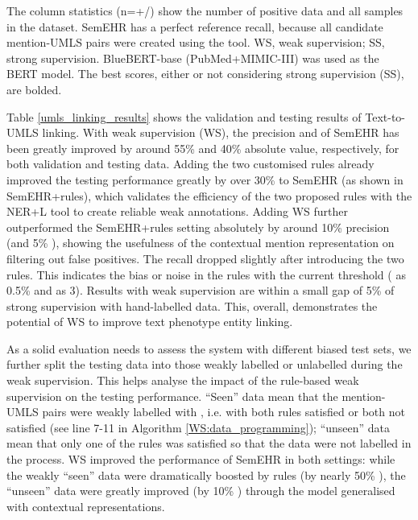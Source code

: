 \documentclass[twocolumn]{bmcart}
\begin{document}
\begin{table*}[th]
\begin{threeparttable}
\begin{tabular}{llll|lll||lll|lll}
\cline{1-13}
\end{tabular}
\begin{tablenotes}
\item The column statistics (n=+/) show the number of positive data  and all samples  in the dataset. SemEHR has a perfect reference recall, because all candidate mention-UMLS pairs were created using the tool. WS, weak supervision; SS, strong supervision. BlueBERT-base (PubMed+MIMIC-III) was used as the BERT model. The best scores, either or not considering strong supervision (SS), are bolded.
\end{tablenotes}
\end{threeparttable}
\end{table*}

Table \ref{umls_linking_results} shows the validation and testing results of Text-to-UMLS linking. With weak supervision (WS), the precision and  of SemEHR has been greatly improved by around 55\% and 40\% absolute value, respectively, for both validation and testing data. Adding the two customised rules already improved the testing performance greatly by over 30\%  to SemEHR (as shown in SemEHR+rules), which validates the efficiency of the two proposed rules with the NER+L tool to create reliable weak annotations. Adding WS further outperformed the SemEHR+rules setting absolutely by around 10\% precision (and 5\% ), showing the usefulness of the contextual mention representation on filtering out false positives. The recall dropped slightly after introducing the two rules. This indicates the bias or noise in the rules with the current threshold ( as 0.5\% and  as 3). Results with weak supervision are within a small gap of 5\%  of strong supervision with hand-labelled data. This, overall, demonstrates the potential of WS to improve text phenotype entity linking.

As a solid evaluation needs to assess the system with different biased test sets, we further split the testing data into those weakly labelled or unlabelled during the weak supervision. This helps analyse the impact of the rule-based weak supervision on the testing performance. ``Seen'' data mean that the mention-UMLS pairs were weakly labelled with , i.e. with both rules satisfied or both not satisfied (see line 7-11 in Algorithm \ref{WS:data_programming}); ``unseen'' data mean that only one of the rules was satisfied so that the data were not labelled in the process. WS improved the performance of SemEHR in both settings: while the weakly ``seen'' data were dramatically boosted by rules (by nearly 50\% ), the ``unseen'' data were greatly improved (by 10\% ) through the model generalised with contextual representations. 
\end{document}
